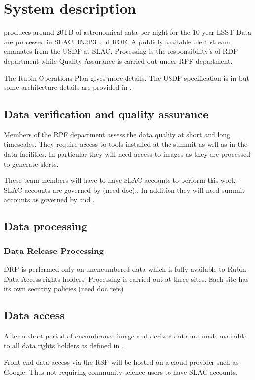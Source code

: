 \section{System description} \label{sec:desc}

\VRO produces around 20TB of astronomical data per night for the 10 year \gls{LSST}
Data are processed in \gls{SLAC}, \gls{IN2P3} and ROE.
A publicly available alert stream emanates from the \gls{USDF} at \gls{SLAC}.
Processing is the responsibility's of \gls{RDP} department while Quality Assurance is carried out under \gls{RPF} department.

The Rubin \gls{Operations} Plan  gives more details.
The USDF specification is in  but some architecture details are provided in .



\subsection{Data verification and quality assurance }
Members of the \gls{RPF} department assess the data quality at short and long timescales.
They require access to tools installed at the summit as well as in the data facilities.
In particular they will need access to images as they are processed to generate alerts.

These team members will have to have \gls{SLAC} accounts to perform this work - \gls{SLAC} accounts are governed by (need doc)..
In addition they will need summit accounts as governed by  and .



\subsection{Data processing}
\subsubsection{Data Release Processing}
DRP is performed only on unencumbered data which is fully available to Rubin Data Access rights holders.
Processing is carried out at three sites.
Each site has its own security policies (need doc refs) 


\subsection{Data access}
After a short period of encumbrance image and derived data are made available to all
data rights holders as defined in .

Front end data access via the \gls{RSP} will be hosted on a cloud provider such as Google.
Thus not requiring community science users to have SLAC accounts.




